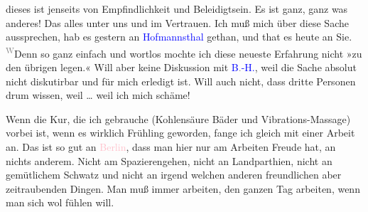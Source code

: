                dieses ist jenseits von Empfindlichkeit und Beleidigtsein. Es ist ganz, ganz was
               anderes! Das alles unter uns und im Vertrauen. Ich muß mich über diese Sache
               aussprechen, hab es gestern an \textcolor{blue}{Hofmannsthal}{}\ledrightnote{\textcolor{blue}{Hugo von Hofmannsthal}} gethan, und that es heute an Sie. \substVorne{}\textsuperscript{\textcolor{gray}{W}}\substDazwischen{}De\substHinten{}nn so ganz einfach und wortlos mochte ich diese neueste Erfahrung nicht »zu
               den übrigen legen.« Will aber keine Diskussion mit \textcolor{blue}{B\textcolor{gray}{.}-H.}{}\ledrightnote{\textcolor{blue}{Richard Beer-Hofmann}}, weil die Sache absolut nicht diskutirbar und
               für mich erledigt ist. Will auch nicht, dass dritte Personen drum wissen, weil {\dots} weil ich mich schäme!\pend
           
\pstart
           Wenn die Kur, die ich gebrauche (Kohlensäure Bäder und Vibrations-Massage) vorbei
               ist, wenn es wirklich Frühling geworden, fange ich gleich mit einer Arbeit an. Das
               ist so gut an \textcolor{pink}{Berlin}{}\ledrightnote{\textcolor{pink}{Berlin}}, dass man hier nur am
               Arbeiten Freude hat, an nichts anderem. Nicht am Spazierengehen, nicht an
               Landparthien, nicht an gemütlichem Schwatz und nicht an irgend welchen anderen
               freundlichen aber zeitraubenden Dingen. Man muß immer arbeiten, den ganzen Tag
               arbeiten, wenn man sich wol fühlen will.\pend
           
